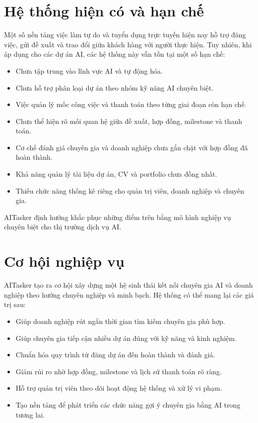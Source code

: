 \section{Hệ thống hiện có và hạn chế}
\label{sec:existing-systems}

Một số nền tảng việc làm tự do và tuyển dụng trực tuyến hiện nay hỗ trợ đăng việc, gửi đề xuất và trao đổi giữa khách hàng với người thực hiện. Tuy nhiên, khi áp dụng cho các dự án AI, các hệ thống này vẫn tồn tại một số hạn chế:

\begin{itemize}
    \item Chưa tập trung vào lĩnh vực AI và tự động hóa.
    \item Chưa hỗ trợ phân loại dự án theo nhóm kỹ năng AI chuyên biệt.
    \item Việc quản lý mốc công việc và thanh toán theo từng giai đoạn còn hạn chế.
    \item Chưa thể hiện rõ mối quan hệ giữa đề xuất, hợp đồng, milestone và thanh toán.
    \item Cơ chế đánh giá chuyên gia và doanh nghiệp chưa gắn chặt với hợp đồng đã hoàn thành.
    \item Khả năng quản lý tài liệu dự án, CV và portfolio chưa đồng nhất.
    \item Thiếu chức năng thống kê riêng cho quản trị viên, doanh nghiệp và chuyên gia.
\end{itemize}

AITasker định hướng khắc phục những điểm trên bằng mô hình nghiệp vụ chuyên biệt cho thị trường dịch vụ AI.

\section{Cơ hội nghiệp vụ}
\label{sec:business-opportunity}

AITasker tạo ra cơ hội xây dựng một hệ sinh thái kết nối chuyên gia AI và doanh nghiệp theo hướng chuyên nghiệp và minh bạch. Hệ thống có thể mang lại các giá trị sau:

\begin{itemize}
    \item Giúp doanh nghiệp rút ngắn thời gian tìm kiếm chuyên gia phù hợp.
    \item Giúp chuyên gia tiếp cận nhiều dự án đúng với kỹ năng và kinh nghiệm.
    \item Chuẩn hóa quy trình từ đăng dự án đến hoàn thành và đánh giá.
    \item Giảm rủi ro nhờ hợp đồng, milestone và lịch sử thanh toán rõ ràng.
    \item Hỗ trợ quản trị viên theo dõi hoạt động hệ thống và xử lý vi phạm.
    \item Tạo nền tảng để phát triển các chức năng gợi ý chuyên gia bằng AI trong tương lai.
\end{itemize}

